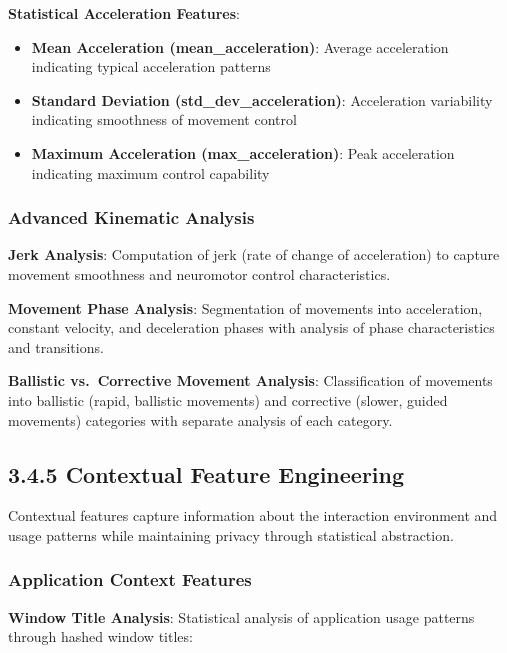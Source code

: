 \documentclass[
  12pt,
  a4paper,
]{report}
\providecommand{\tightlist}{%
  \setlength{\itemsep}{0pt}\setlength{\parskip}{0pt}}
\begin{document}
\textbf{Statistical Acceleration Features}:

\begin{itemize}
\tightlist
\item
  \textbf{Mean Acceleration (mean\_acceleration)}: Average acceleration
  indicating typical acceleration patterns
\item
  \textbf{Standard Deviation (std\_dev\_acceleration)}: Acceleration
  variability indicating smoothness of movement control
\item
  \textbf{Maximum Acceleration (max\_acceleration)}: Peak acceleration
  indicating maximum control capability
\end{itemize}

\subsubsection{Advanced Kinematic
Analysis}\label{advanced-kinematic-analysis}

\textbf{Jerk Analysis}: Computation of jerk (rate of change of
acceleration) to capture movement smoothness and neuromotor control
characteristics.

\textbf{Movement Phase Analysis}: Segmentation of movements into
acceleration, constant velocity, and deceleration phases with analysis
of phase characteristics and transitions.

\textbf{Ballistic vs.~Corrective Movement Analysis}: Classification of
movements into ballistic (rapid, ballistic movements) and corrective
(slower, guided movements) categories with separate analysis of each
category.

\subsection{3.4.5 Contextual Feature
Engineering}\label{contextual-feature-engineering}

Contextual features capture information about the interaction
environment and usage patterns while maintaining privacy through
statistical abstraction.

\subsubsection{Application Context
Features}\label{application-context-features}

\textbf{Window Title Analysis}: Statistical analysis of application
usage patterns through hashed window titles:
\end{document}
